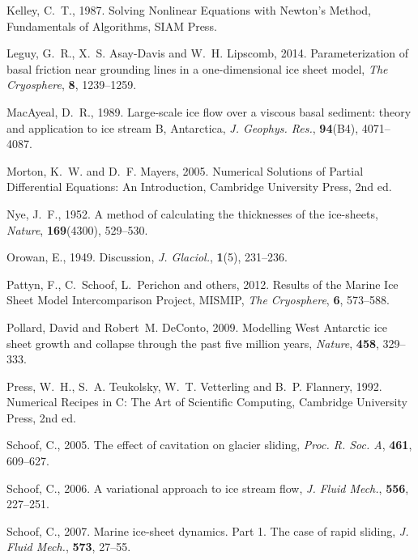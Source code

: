 \documentclass[twocolumn]{igs}
\begin{document}
\begin{thebibliography}{29}
Kelley, C.~T., 1987. Solving Nonlinear Equations with Newton's Method,
  Fundamentals of Algorithms, SIAM Press.

Leguy, G.~R., X.~S. Asay-Davis and W.~H. Lipscomb, 2014. Parameterization of
  basal friction near grounding lines in a one-dimensional ice sheet model,
  {\em The Cryosphere\/}, {\bf 8}, 1239--1259.

MacAyeal, D.~R., 1989. Large-scale ice flow over a viscous basal sediment:
  theory and application to ice stream {B}, {A}ntarctica, {\em J. Geophys.
  Res.\/}, {\bf 94}(B4), 4071--4087.

Morton, K.~W. and D.~F. Mayers, 2005. Numerical {S}olutions of {P}artial
  {D}ifferential {E}quations: {A}n {I}ntroduction, Cambridge University Press,
  2nd ed.

Nye, J.~F., 1952. A method of calculating the thicknesses of the ice-sheets,
  {\em Nature\/}, {\bf 169}(4300), 529--530.

Orowan, E., 1949. Discussion, {\em J. Glaciol.\/}, {\bf 1}(5), 231--236.

Pattyn, F., C.~Schoof, L.~Perichon and others, 2012. Results of the {M}arine
  {I}ce {S}heet {M}odel {I}ntercomparison {P}roject, {MISMIP}, {\em The
  Cryosphere\/}, {\bf 6}, 573--588.

Pollard, David and Robert~M. DeConto, 2009. Modelling {W}est {A}ntarctic ice
  sheet growth and collapse through the past five million years, {\em
  Nature\/}, {\bf 458}, 329--333.

Press, W.~H., S.~A. Teukolsky, W.~T. Vetterling and B.~P. Flannery, 1992.
  Numerical {R}ecipes in {C}: {T}he {A}rt of {S}cientific {C}omputing,
  Cambridge University Press, 2nd ed.

Schoof, C., 2005. The effect of cavitation on glacier sliding, {\em Proc. R.
  Soc. A\/}, {\bf 461}, 609--627.

Schoof, C., 2006. A variational approach to ice stream flow, {\em J. Fluid
  Mech.\/}, {\bf 556}, 227--251.

Schoof, C., 2007. Marine ice-sheet dynamics. {P}art 1. {T}he case of rapid
  sliding, {\em J. Fluid Mech.\/}, {\bf 573}, 27--55.


\end{thebibliography}
\end{document}
